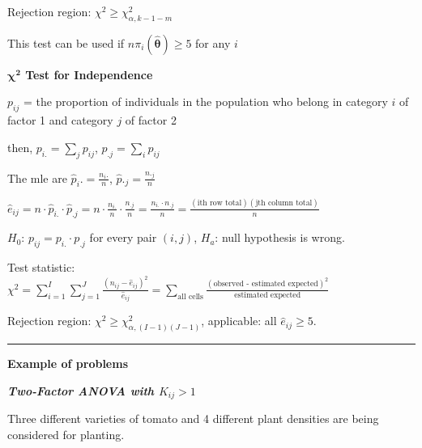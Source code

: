 \documentclass{article}
\newcommand{\sectionline}{\color{black}\rule[2pt]{0.45\textwidth}{0.05em}\color{black}}
\newcommand{\bigtitle}[1]{
	\noindent
	\textbf{#1}
}
\newcommand{\smalltitle}[1]{
	\noindent
	\textbf{\textit{#1}}
}
\begin{document}
	Rejection region: $\chi ^ { 2 } \geq \chi _ { \alpha , k - 1 - m} ^ { 2 }$
	
	This test can be used if $n \pi _ { i } ( \hat { \boldsymbol { \theta } } ) \geq 5$ for any $i$
	
	\bigtitle{$\mathbf{\chi^2}$ Test for Independence}
	
	$p_{ij}$ = the proportion of individuals in the population who belong in category $i$ of factor 1 and category $j$ of factor 2
	
	then, $p_{i.} = \sum_j p_{ij}$, $p_{.j} = \sum_{ i } p_{ij}$
	
	The mle are $\hat { p } _ { i } . = \frac { n _ { i } .} { n }$, $\hat { p }. _ {  j } = \frac { n . _ {  j } } { n }$
	
	
	\noindent
	$\hat { e } _ { i j } = n \cdot \hat { p } _ { i . } \cdot \hat { p } _ { . j } = n \cdot \frac { n _ { i . } } { n } \cdot \frac { n _ { . j } } { n } = \frac { n _ { i . } \cdot n _ { . j } } { n } = \frac{(\text{ith row total})(\text{jth column total})}{n}$
	
	$H_0$: $p_{ij} = p_{i.} \cdot p_{.j}$ for every pair $(i,j)$,
	$H_a$: null hypothesis is wrong.
	
	Test statistic:\\ $\chi^2 = \sum \limits _ { i = 1 } ^ { I } \sum \limits_ { j = 1 } ^ { J } \frac { \left( n _ { i j } - \hat { e } _ { i j } \right) ^ { 2 } } { \hat { e } _ { i j } } = \sum \limits_{\text{all cells}} \frac{(\text{observed - estimated expected})^2}{\text{estimated expected}}$
	
	
	Rejection region: $\chi ^ { 2 } \geq \chi _ { \alpha , ( I - 1 ) ( J - 1 ) } ^ { 2 }$, applicable: all $\hat{e}_{ij} \geq 5$.
	
	\sectionline
	
	\bigtitle{Example of problems}
	
	\smalltitle{Two-Factor ANOVA with $K_{ij}>1$}
	
	Three different varieties of tomato and 4 different plant densities are being considered for planting.
	
\end{document}
